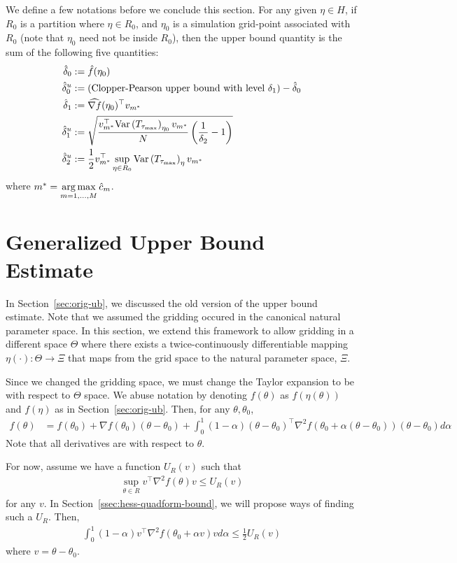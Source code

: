 \documentclass[10pt]{article}
\begin{document}
We define a few notations before we conclude this section.
For any given $\eta \in H$, if $R_0$ is a partition where $\eta \in R_0$,
and $\eta_0$ is a simulation grid-point associated with $R_0$
(note that $\eta_0$ need not be inside $R_0$),
then the upper bound quantity is the sum of the following five quantities:
\begin{align*}
    \hat{\delta}_0 &:= \hat{f}(\eta_0) \\
    \hat{\delta}_0^u &:= \text{(Clopper-Pearson upper bound with level $\delta_1$)} - \hat{\delta}_0 \\
    \hat{\delta}_1 &:= \widehat{\nabla f}(\eta_0)^\top v_{m^*} \\
    \hat{\delta}_1^u &:= \sqrt{%
        \frac{v_{m^*}^\top \var{T_{\tau_{\max}}}_{\eta_0} v_{m^*}}{N} 
        \paren{\frac{1}{\delta_2}-1}
    } \\
    \hat{\delta}_2^u &:= \frac{1}{2} 
    v_{m^*}^\top \sup\limits_{\eta \in R_0} \var{T_{\tau_{\max}}}_{\eta} v_{m^*}
\end{align*}
where $m^* = \operatorname*{arg\,max}\limits_{m=1,\ldots, M} \hat{c}_m$.

\section{Generalized Upper Bound Estimate}\label{sec:gen-ub}

In Section~\ref{sec:orig-ub}, we discussed the old version of the upper bound estimate.
Note that we assumed the gridding occured in the canonical natural parameter space.
In this section, we extend this framework to allow gridding in a different space $\Theta$
where there exists a twice-continuously differentiable mapping $\eta(\cdot) : \Theta \to \Xi$
that maps from the grid space to the natural parameter space, $\Xi$.

Since we changed the gridding space, we must change the Taylor expansion
to be with respect to $\Theta$ space.
We abuse notation by denoting $f(\theta)$ as $f(\eta(\theta))$
and $f(\eta)$ as in Section~\ref{sec:orig-ub}.
Then, for any $\theta, \theta_0$,
\begin{align*}
    f(\theta)
    &=
    f(\theta_0)
    +
    \nabla f(\theta_0) (\theta - \theta_0)
    +
    \int_0^1 (1-\alpha) 
    (\theta-\theta_0)^\top
    \nabla^2 f(\theta_0 + \alpha (\theta-\theta_0))
    (\theta-\theta_0)
    d\alpha
\end{align*}
Note that all derivatives are with respect to $\theta$.

For now, assume we have a function $U_R(v)$ such that
\begin{align*}
    \sup\limits_{\theta \in R}
    v^\top \nabla^2 f(\theta) v
    \leq
    U_R(v)
\end{align*}
for any $v$.
In Section~\ref{ssec:hess-quadform-bound},
we will propose ways of finding such a $U_R$.
Then,
\begin{align*}
    \int_0^1 (1-\alpha) v^\top \nabla^2 f(\theta_0 + \alpha v) v d\alpha
    \leq
    \frac{1}{2} U_R(v)
\end{align*}
where $v = \theta-\theta_0$.
\end{document}
